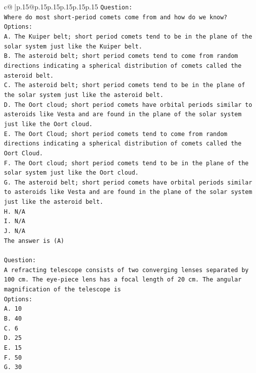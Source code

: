 \documentclass{article}
\begin{document}
{\begin{supertabular}{c@{$\;$}|p{.15\linewidth}@{}p{.15\linewidth}p{.15\linewidth}p{.15\linewidth}p{.15\linewidth}p{.15\linewidth}}
{{{\texttt{Question:} \\
\texttt{Where do most short{-}period comets come from and how do we know?} \\
\texttt{Options:} \\
\texttt{A. The Kuiper belt; short period comets tend to be in the plane of the solar system just like the Kuiper belt.} \\
\texttt{B. The asteroid belt; short period comets tend to come from random directions indicating a spherical distribution of comets called the asteroid belt.} \\
\texttt{C. The asteroid belt; short period comets tend to be in the plane of the solar system just like the asteroid belt.} \\
\texttt{D. The Oort cloud; short period comets have orbital periods similar to asteroids like Vesta and are found in the plane of the solar system just like the Oort cloud.} \\
\texttt{E. The Oort Cloud; short period comets tend to come from random directions indicating a spherical distribution of comets called the Oort Cloud.} \\
\texttt{F. The Oort cloud; short period comets tend to be in the plane of the solar system just like the Oort cloud.} \\
\texttt{G. The asteroid belt; short period comets have orbital periods similar to asteroids like Vesta and are found in the plane of the solar system just like the asteroid belt.} \\
\texttt{H. N/A} \\
\texttt{I. N/A} \\
\texttt{J. N/A} \\
\texttt{The answer is (A)} \\
\\ 
\texttt{Question:} \\
\texttt{A refracting telescope consists of two converging lenses separated by 100 cm. The eye{-}piece lens has a focal length of 20 cm. The angular magnification of the telescope is} \\
\texttt{Options:} \\
\texttt{A. 10} \\
\texttt{B. 40} \\
\texttt{C. 6} \\
\texttt{D. 25} \\
\texttt{E. 15} \\
\texttt{F. 50} \\
\texttt{G. 30} \\
}}}
\end{supertabular}}
\end{document}
